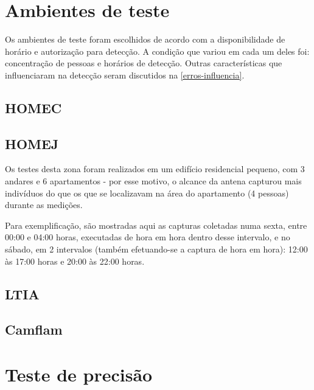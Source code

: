 \section{Ambientes de teste}
Os ambientes de teste foram escolhidos de acordo com a disponibilidade de horário e autorização
para detecção. A condição que variou em cada um deles foi: concentração de pessoas e horários de detecção.
Outras características que influenciaram na detecção seram discutidos na \autoref{erros-influencia}.

\subsection{HOMEC}

\subsection{HOMEJ}
Os testes desta zona foram realizados em um edifício residencial pequeno, com 3
andares e 6 apartamentos - por esse motivo, o alcance da antena capturou mais
indivíduos do que os que se localizavam na área do apartamento (4 pessoas)
durante as medições.

Para exemplificação, são mostradas aqui as capturas coletadas numa sexta, entre
00:00 e 04:00 horas, executadas de hora em hora dentro desse intervalo, e no
sábado, em 2 intervalos (também efetuando-se a captura de hora em hora): 12:00
às 17:00 horas e 20:00 às 22:00 horas.

\subsection{LTIA}

\subsection{Camflam}

\section{Teste de precisão}

